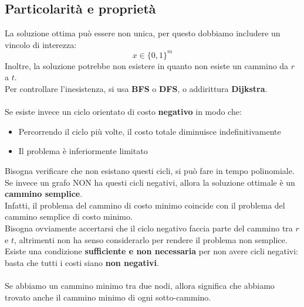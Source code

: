 \documentclass[12pt,a4paper]{article}
\begin{document}
\subsection{Particolarità e proprietà}
La soluzione ottima può essere non unica, per questo dobbiamo includere un vincolo di interezza:
\[
x \in \{0,1\}^m
\]
Inoltre, la soluzione potrebbe non esistere in quanto non esiste un cammino da $r$ a $t$.\\
Per controllare l'inesistenza, si usa \textbf{BFS} o \textbf{DFS}, o addirittura \textbf{Dijkstra}.\\\\
Se esiste invece un ciclo orientato di costo \textbf{negativo} in modo che:
\begin{itemize}
    \item Percorrendo il ciclo più volte, il costo totale diminuisce indefinitivamente
    \item Il problema è inferiormente limitato
\end{itemize}
Bisogna verificare che non esistano questi cicli, si può fare in tempo polinomiale.\\
Se invece un grafo NON ha questi cicli negativi, allora la soluzione ottimale è un \textbf{cammino semplice}.\\
Infatti, il problema del cammino di costo minimo coincide con il problema del cammino semplice di costo minimo.\\
Bisogna ovviamente accertarsi che il ciclo negativo faccia parte del cammino tra $r$ e $t$, altrimenti non ha senso considerarlo per rendere il problema non semplice.\\
Esiste una condizione \textbf{sufficiente e non necessaria} per non avere cicli negativi: basta che tutti i costi siano \textbf{non negativi}.\\\\
Se abbiamo un cammino minimo tra due nodi, allora significa che abbiamo trovato anche il cammino minimo di ogni sotto-cammino.
\end{document}
